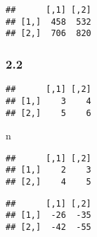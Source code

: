 \documentclass[
]{article}
\newenvironment{Shaded}{\begin{snugshade}}{\end{snugshade}}
\newcommand{\CommentTok}[1]{\textcolor[rgb]{0.56,0.35,0.01}{\textit{#1}}}
\newcommand{\ControlFlowTok}[1]{\textcolor[rgb]{0.13,0.29,0.53}{\textbf{#1}}}
\newcommand{\DecValTok}[1]{\textcolor[rgb]{0.00,0.00,0.81}{#1}}
\newcommand{\KeywordTok}[1]{\textcolor[rgb]{0.13,0.29,0.53}{\textbf{#1}}}
\newcommand{\NormalTok}[1]{#1}
\newcommand{\OperatorTok}[1]{\textcolor[rgb]{0.81,0.36,0.00}{\textbf{#1}}}
\newcommand{\OtherTok}[1]{\textcolor[rgb]{0.56,0.35,0.01}{#1}}
\newcommand{\StringTok}[1]{\textcolor[rgb]{0.31,0.60,0.02}{#1}}
\begin{document}
\begin{verbatim}
##      [,1] [,2]
## [1,]  458  532
## [2,]  706  820
\end{verbatim}

\hypertarget{section-4}{%
\subsubsection{2.2}\label{section-4}}

\begin{Shaded}
\end{Shaded}

\begin{verbatim}
##      [,1] [,2]
## [1,]    3    4
## [2,]    5    6
\end{verbatim}

\begin{Shaded}
\begin{Highlighting}[]
\NormalTok{n}
\end{Highlighting}
\end{Shaded}

\begin{verbatim}
##      [,1] [,2]
## [1,]    2    3
## [2,]    4    5
\end{verbatim}

\begin{Shaded}
\end{Shaded}

\begin{verbatim}
##      [,1] [,2]
## [1,]  -26  -35
## [2,]  -42  -55
\end{verbatim}
\end{document}
